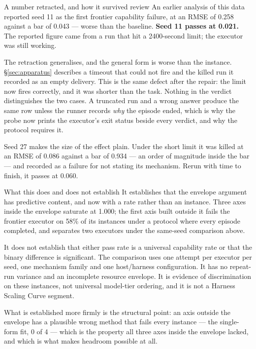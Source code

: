 \begin{cautionbox}{A number retracted, and how it survived review}
An earlier analysis of this data reported seed 11 as the first frontier capability failure, at an RMSE of 0.258 against a bar of 0.043 --- worse than the baseline. \textbf{Seed 11 passes at 0.021.} The reported figure came from a run that hit a 2400-second limit; the executor was still working.

The retraction generalises, and the general form is worse than the instance. \S\ref{sec:apparatus} describes a timeout that could not fire and the killed run it recorded as an empty delivery. This is the same defect after the repair: the limit now fires correctly, and it was shorter than the task. Nothing in the verdict distinguishes the two cases. A truncated run and a wrong answer produce the same row unless the runner records \emph{why} the episode ended, which is why the probe now prints the executor's exit status beside every verdict, and why the protocol requires it.

Seed 27 makes the size of the effect plain. Under the short limit it was killed at an RMSE of 0.086 against a bar of 0.934 --- an order of magnitude inside the bar --- and recorded as a failure for not stating its mechanism. Rerun with time to finish, it passes at 0.060.
\end{cautionbox}

\begin{claimbox}{What this does and does not establish}
It establishes that the envelope argument has predictive content, and now with a rate rather than an instance. Three axes inside the envelope saturate at 1.000; the first axis built outside it fails the frontier executor on 58\% of its instances under a protocol where every episode completed, and separates two executors under the same-seed comparison above.

It does not establish that either pass rate is a universal capability rate or that the binary difference is significant. The comparison uses one attempt per executor per seed, one mechanism family and one host/harness configuration. It has no repeat-run variance and an incomplete resource envelope. It is evidence of discrimination on these instances, not universal model-tier ordering, and it is not a Harness Scaling Curve segment.
\end{claimbox}

What is established more firmly is the structural point: an axis outside the envelope has a plausible wrong method that fails every instance --- the single-form fit, 0 of 4 --- which is the property all three axes inside the envelope lacked, and which is what makes headroom possible at all.

